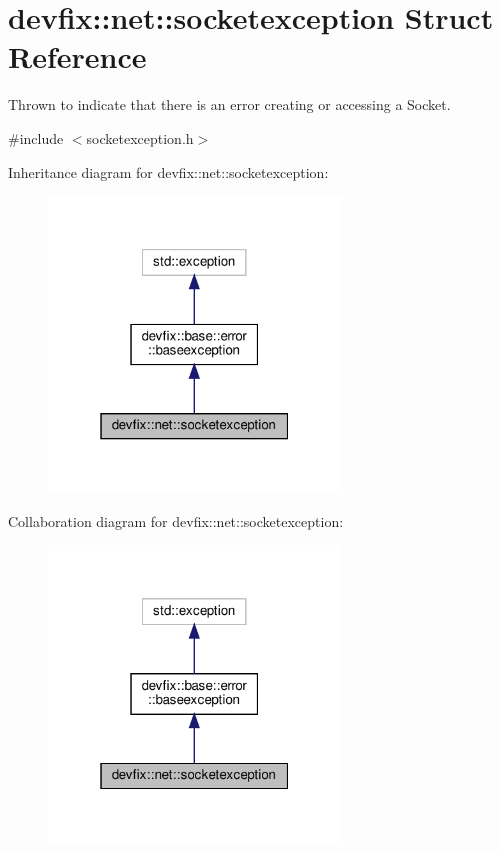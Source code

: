 \hypertarget{structdevfix_1_1net_1_1socketexception}{}\section{devfix\+:\+:net\+:\+:socketexception Struct Reference}
\label{structdevfix_1_1net_1_1socketexception}


Thrown to indicate that there is an error creating or accessing a Socket.  




{\ttfamily \#include $<$socketexception.\+h$>$}



Inheritance diagram for devfix\+:\+:net\+:\+:socketexception\+:\nopagebreak
\begin{figure}[H]
\begin{center}
\leavevmode
\includegraphics[width=220pt]{structdevfix_1_1net_1_1socketexception__inherit__graph}
\end{center}
\end{figure}


Collaboration diagram for devfix\+:\+:net\+:\+:socketexception\+:\nopagebreak
\begin{figure}[H]
\begin{center}
\leavevmode
\includegraphics[width=220pt]{structdevfix_1_1net_1_1socketexception__coll__graph}
\end{center}
\end{figure}
